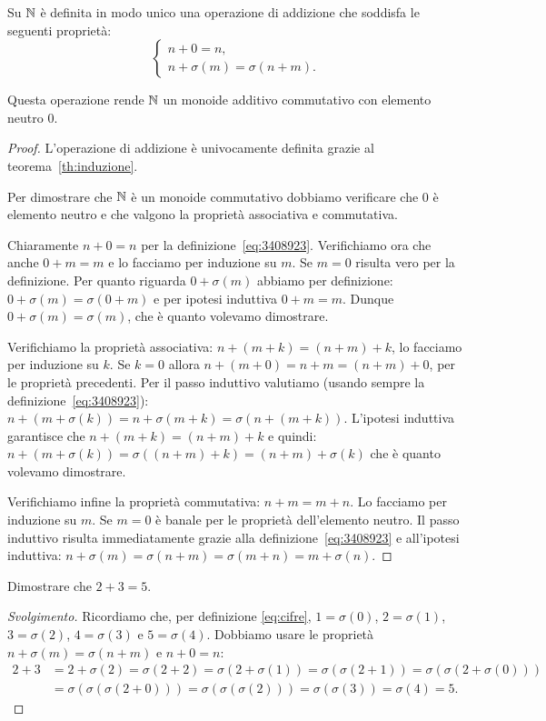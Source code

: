 \begin{theorem}[addizione su $\NN$]
  \label{th:addizione_naturali}%
Su $\NN$ è definita in modo unico una operazione di addizione 
che soddisfa le seguenti proprietà:
\begin{equation}\label{eq:3408923}
  \begin{cases}
    n + 0 = n,\\
    n + \sigma(m) = \sigma(n+m).
  \end{cases}
\end{equation}

Questa operazione rende $\NN$ un monoide additivo commutativo 
con elemento neutro $0$.
\end{theorem}
\begin{proof}
L'operazione di addizione è univocamente definita 
grazie al teorema~\ref{th:induzione}.

Per dimostrare che $\NN$ è un monoide commutativo dobbiamo verificare
che $0$ è elemento neutro e che valgono la proprietà associativa 
e commutativa.

Chiaramente $n+0=n$ per la definizione~\eqref{eq:3408923}. 
Verifichiamo ora che anche $0+m=m$ e lo facciamo per induzione su $m$.
Se $m=0$ risulta vero per la definizione.
Per quanto riguarda $0+\sigma(m)$ abbiamo per definizione:
$0+\sigma(m)=\sigma(0+m)$ e per ipotesi induttiva $0+m=m$.
Dunque $0+\sigma(m)=\sigma(m)$, che è quanto volevamo dimostrare.

Verifichiamo la proprietà associativa: $n+(m+k) = (n+m)+k$, lo 
facciamo per induzione su $k$. 
Se $k=0$ allora $n+(m+0)=n+m=(n+m)+0$, per le proprietà precedenti.
Per il passo induttivo valutiamo (usando sempre la definizione~\eqref{eq:3408923}):
$n+(m+\sigma(k)) = n+\sigma(m+k) =\sigma(n+(m+k))$.
L'ipotesi induttiva garantisce che $n+(m+k)=(n+m)+k$ e quindi:
$n+(m+\sigma(k)) = \sigma((n+m)+k) = (n+m)+\sigma(k)$
che è quanto volevamo dimostrare.

Verifichiamo infine la proprietà commutativa: $n+m=m+n$.
Lo facciamo per induzione su $m$. 
Se $m=0$ è banale per le proprietà dell'elemento neutro.
Il passo induttivo risulta immediatamente 
grazie alla definizione~\ref{eq:3408923} 
e all'ipotesi induttiva: 
$n+\sigma(m) = \sigma(n+m) = \sigma(m+n) = m+\sigma(n)$.
\end{proof}

\begin{example}\label{ex235}
  Dimostrare che $2+3=5$.
\end{example}  
%
\begin{proof}[Svolgimento]
Ricordiamo che, per definizione \eqref{eq:cifre}, 
$1=\sigma(0)$, $2=\sigma(1)$, $3=\sigma(2)$, $4=\sigma(3)$ e $5=\sigma(4)$.
Dobbiamo usare le proprietà $n+\sigma(m) = \sigma(n+m)$ 
e $n+0=n$:
\begin{align*}
2+3 &= 2 + \sigma(2) = \sigma(2+2) = \sigma(2+\sigma(1))
=\sigma(\sigma(2+1)) = \sigma(\sigma(2+\sigma(0)))\\
&=\sigma(\sigma(\sigma(2+0)))
=\sigma(\sigma(\sigma(2)))
=\sigma(\sigma(3))
=\sigma(4)=5.
\end{align*}
\end{proof}


